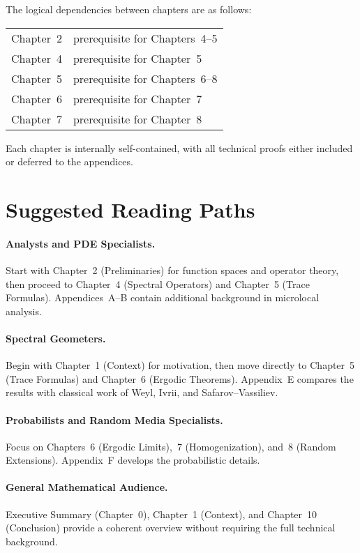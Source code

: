 The logical dependencies between chapters are as follows:

\begin{center}
\begin{tabular}{ll}
Chapter~2 & prerequisite for Chapters~4–5 \\
Chapter~4 & prerequisite for Chapter~5 \\
Chapter~5 & prerequisite for Chapters~6–8 \\
Chapter~6 & prerequisite for Chapter~7 \\
Chapter~7 & prerequisite for Chapter~8 \\
\end{tabular}
\end{center}

Each chapter is internally self-contained, with all technical proofs either
included or deferred to the appendices.

\section*{Suggested Reading Paths}

\paragraph{Analysts and PDE Specialists.}
Start with Chapter~2 (Preliminaries) for function spaces and operator theory,
then proceed to Chapter~4 (Spectral Operators) and Chapter~5 (Trace Formulas).
Appendices~A–B contain additional background in microlocal analysis.

\paragraph{Spectral Geometers.}
Begin with Chapter~1 (Context) for motivation, then move directly to
Chapter~5 (Trace Formulas) and Chapter~6 (Ergodic Theorems).
Appendix~E compares the results with classical work of Weyl, Ivrii,
and Safarov–Vassiliev.

\paragraph{Probabilists and Random Media Specialists.}
Focus on Chapters~6 (Ergodic Limits),~7 (Homogenization),
and~8 (Random Extensions).
Appendix~F develops the probabilistic details.

\paragraph{General Mathematical Audience.}
Executive Summary (Chapter~0), Chapter~1 (Context), and Chapter~10 (Conclusion)
provide a coherent overview without requiring the full technical background.

